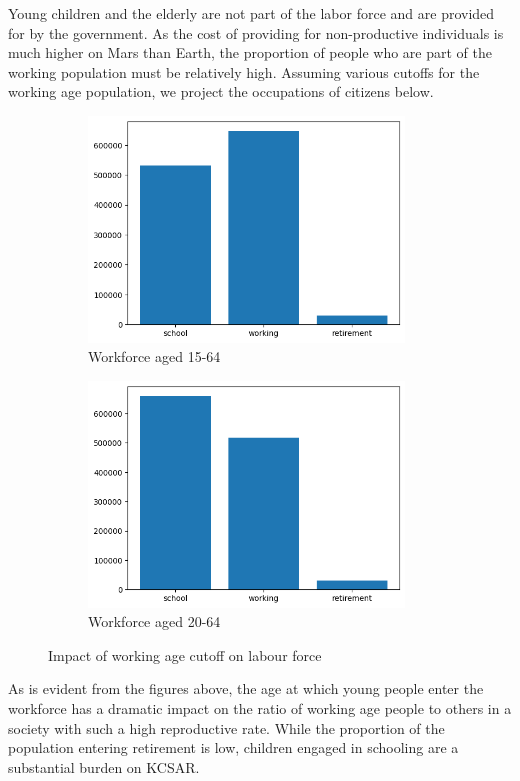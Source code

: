 \documentclass[fleqn,10pt]{Stylesheet} %
\begin{document}
Young children and the elderly are not part of the labor force and are provided for by the government. As the cost of providing for non-productive individuals is much higher on Mars than Earth, the proportion of people who are part of the working population must be relatively high. Assuming various cutoffs for the working age population, we project the occupations of citizens below.

\begin{figure}[t!]
    \begin{subfigure}[t]{0.45\textwidth}
        \centering
        \includegraphics[height=60mm]{fig_demo_down.png}
        \caption{Workforce aged 15-64}
    \end{subfigure}%
    \qquad \qquad  %
    \begin{subfigure}[t]{0.45\textwidth}
        \centering
        \includegraphics[height=60mm]{fig_demo.png}
        \caption{Workforce aged 20-64}
    \end{subfigure}
\caption{Impact of working age cutoff on labour force}\label{fig:animals}
\end{figure}

As is evident from the figures above, the age at which young people enter the workforce has a dramatic impact on the ratio of working age people to others in a society with such a high reproductive rate. While the proportion of the population entering retirement is low, children engaged in schooling are a substantial burden on KCSAR. 
\end{document}
